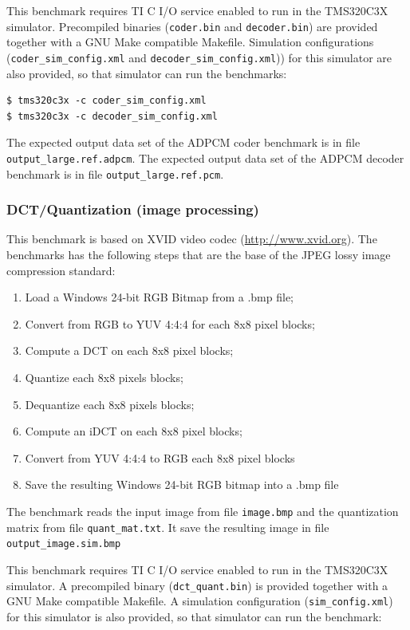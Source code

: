 This benchmark requires TI C I/O service enabled to run in the TMS320C3X simulator.
Precompiled binaries (\texttt{coder.bin} and \texttt{decoder.bin}) are provided together with a GNU Make compatible Makefile.
Simulation configurations (\texttt{coder\_sim\_config.xml} and \texttt{decoder\_sim\_config.xml})) for this simulator are also provided, so that simulator can run the benchmarks:

\begin{verbatim}
$ tms320c3x -c coder_sim_config.xml
$ tms320c3x -c decoder_sim_config.xml
\end{verbatim}

The expected output data set of the ADPCM coder benchmark is in file \texttt{output\_large.ref.adpcm}.
The expected output data set of the ADPCM decoder benchmark is in file \texttt{output\_large.ref.pcm}.

\subsubsection{DCT/Quantization (image processing)}

This benchmark is based on XVID video codec (\url{http://www.xvid.org}).
The benchmarks has the following steps that are the base of the JPEG lossy image compression standard:
\begin{enumerate}
\item Load a Windows 24-bit RGB Bitmap from a .bmp file;
\item Convert from RGB to YUV 4:4:4 for each 8x8 pixel blocks;
\item Compute a DCT on each 8x8 pixel blocks;
\item Quantize each 8x8 pixels blocks;
\item Dequantize each 8x8 pixels blocks;
\item Compute an iDCT on each 8x8 pixel blocks;
\item Convert from YUV 4:4:4 to RGB each 8x8 pixel blocks
\item Save the resulting Windows 24-bit RGB bitmap into a .bmp file
\end{enumerate}

The benchmark reads the input image from file \texttt{image.bmp} and the quantization matrix from file \texttt{quant\_mat.txt}.
It save the resulting image in file \texttt{output\_image.sim.bmp}

This benchmark requires TI C I/O service enabled to run in the TMS320C3X simulator.
A precompiled binary (\texttt{dct\_quant.bin}) is provided together with a GNU Make compatible Makefile.
A simulation configuration (\texttt{sim\_config.xml}) for this simulator is also provided, so that simulator can run the benchmark:

